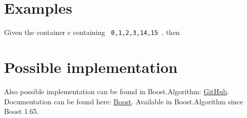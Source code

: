 \documentclass{wg21}
\newcommand{\cc}[1]{\texttt{#1}}
\begin{document}
\section{Examples}
Given the container c containing \cc{ 0,1,2,3,14,15 }, then
\begin{quote}
\end{quote}

\section{Possible implementation}
Also possible implementation can be found in Boost.Algorithm: \href{https://github.com/boostorg/algorithm/blob/master/include/boost/algorithm/is_partitioned_until.hpp}{GitHub}. Documentation can be found here: \href{https://www.boost.org/doc/libs/1_70_0/libs/algorithm/doc/html/the_boost_algorithm_library/Misc/is_partitioned_until.html}{Boost}. Available in Boost.Algorithm since Boost 1.65.
\end{document}
